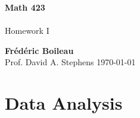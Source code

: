 \documentclass{article}\usepackage[]{graphicx}\usepackage[]{color}
\begin{document}
	\begin{titlepage}
		\begin{center}
			\vspace*{1cm}
			\textbf{Math 423}\\
			\\
			\vspace{0.5cm}
			Homework I
			
			\vspace{1.5cm}
			
			\textbf{Frédéric Boileau}\\
			\vspace{2cm}
			Prof. 
			David A. Stephens
			\vfill
			\today
			\thispagestyle{empty}
		\end{center}
	\end{titlepage}
	
\section{Data Analysis}
\end{document}

